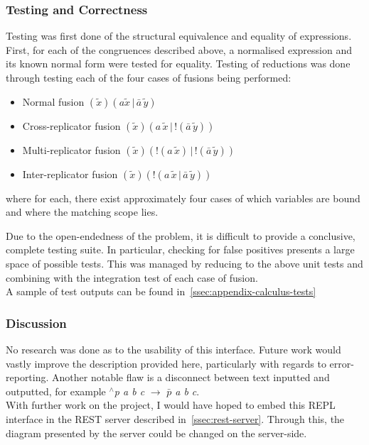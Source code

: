     \subsubsection{Testing and Correctness}\label{sssec:repl-testing}
        Testing was first done of the structural equivalence and equality of expressions.
        First, for each of the congruences described above, a normalised expression and its known normal form were tested for equality.
        Testing of reductions was done through testing each of the four cases of fusions being performed:
        \begin{itemize}
            \item Normal fusion $(\tilde{x})(a \tilde{x} \,|\, \bar{a} \, \tilde{y})$
            \item Cross-replicator fusion $(\tilde{x})(a \, \tilde{x} \,|\, !(\bar{a} \, \tilde{y}))$
            \item Multi-replicator fusion $(\tilde{x})(!(a \, \tilde{x}) \,|\, !(\bar{a} \, \tilde{y}))$
            \item Inter-replicator fusion $(\tilde{x})(!(a \, \tilde{x} \,|\, \bar{a} \, \tilde{y}))$
        \end{itemize} 
        where for each, there exist approximately four cases of which variables are bound and where the matching scope lies.

        Due to the open-endedness of the problem, it is difficult to provide a conclusive, complete testing suite.
        In particular, checking for false positives presents a large space of possible tests.
        This was managed by reducing to the above unit tests and combining with the integration test of each case of fusion.\\

        A sample of test outputs can be found in~\ref{ssec:appendix-calculus-tests}


    \subsubsection{Discussion}
        No research was done as to the usability of this interface.
        Future work would vastly improve the description provided here, particularly with regards to error-reporting.
        Another notable flaw is a disconnect between text inputted and outputted, for example \textit{$^{\wedge}$p a b c} $\rightarrow$ \textit{$\bar{p}$ a b c}.\\

        With further work on the project, I would have hoped to embed this REPL interface in the REST server described in~\ref{ssec:rest-server}.
        Through this, the diagram presented by the server could be changed on the server-side.
